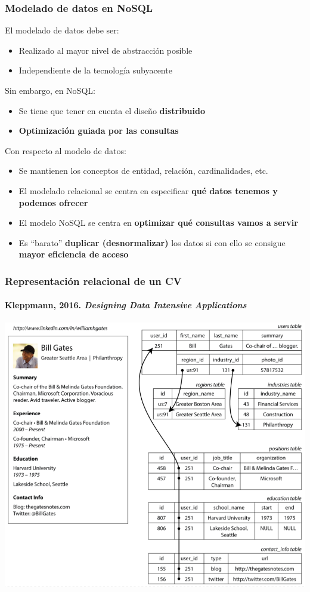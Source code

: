\begin{frame}[allowframebreaks]
  \frametitle{Modelado de datos en NoSQL}
El modelado de datos debe ser:
  \begin{itemize}
  \item Realizado al mayor nivel de abstracción posible
  \item Independiente de la tecnología subyacente
  \end{itemize}
Sin embargo, en NoSQL:
  \begin{itemize}
  \item Se tiene que tener en cuenta el diseño {\bf distribuido}
  \item {\bf Optimización guiada por las consultas}
  \end{itemize}

  \framebreak
Con respecto al modelo de datos:

\begin{itemize}
\item Se mantienen los conceptos de entidad, relación, cardinalidades, etc.
\item El modelado relacional se centra en especificar {\bf qué datos
    tenemos y podemos ofrecer}
\item El modelo NoSQL se centra en {\bf optimizar qué
    consultas vamos a servir}
\item Es ``barato'' {\bf duplicar (desnormalizar)} los datos si con ello se
  consigue {\bf mayor eficiencia de acceso}
\end{itemize}

\end{frame}

\begin{frame}
  \frametitle{Representación relacional de un CV}
\framesubtitle{Kleppmann, 2016. \emph{Designing Data Intensive Applications}}
  \centering\includegraphics[height=.81\textheight]{img/gates}
\end{frame}

